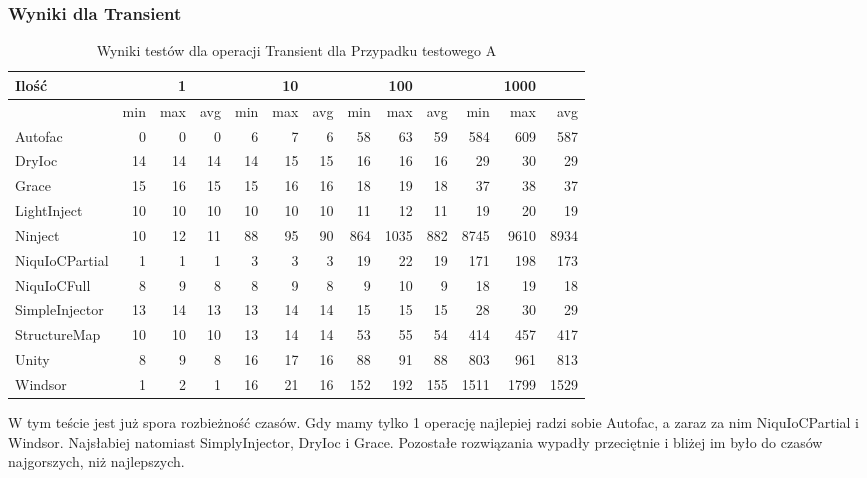 \documentclass[12pt]{article}
\begin{document}
\subsubsection{Wyniki dla Transient}
\begin{table}[H]
\captionsetup{belowskip=0pt,aboveskip=0pt}
\begin{center}
\begin{small}
	\begin{tabular}{ | l | r r r | r r r | r r r | r r r | }
    		\hline
Ilość & & 1 & & & 10 & & & 100 & & & 1000 & \\ \hline
 & min & max & avg & min & max & avg & min & max & avg & min & max & avg \\ \hline
Autofac & 0 & 0 & 0 & 6 & 7 & 6 & 58 & 63 & 59 & 584 & 609 & 587 \\ \hline
DryIoc & 14 & 14 & 14 & 14 & 15 & 15 & 16 & 16 & 16 & 29 & 30 & 29 \\ \hline
Grace & 15 & 16 & 15 & 15 & 16 & 16 & 18 & 19 & 18 & 37 & 38 & 37 \\ \hline
LightInject & 10 & 10 & 10 & 10 & 10 & 10 & 11 & 12 & 11 & 19 & 20 & 19 \\ \hline
Ninject & 10 & 12 & 11 & 88 & 95 & 90 & 864 & 1035 & 882 & 8745 & 9610 & 8934 \\ \hline
NiquIoCPartial & 1 & 1 & 1 & 3 & 3 & 3 & 19 & 22 & 19 & 171 & 198 & 173 \\ \hline
NiquIoCFull & 8 & 9 & 8 & 8 & 9 & 8 & 9 & 10 & 9 & 18 & 19 & 18 \\ \hline
SimpleInjector & 13 & 14 & 13 & 13 & 14 & 14 & 15 & 15 & 15 & 28 & 30 & 29 \\ \hline
StructureMap & 10 & 10 & 10 & 13 & 14 & 14 & 53 & 55 & 54 & 414 & 457 & 417 \\ \hline
Unity & 8 & 9 & 8 & 16 & 17 & 16 & 88 & 91 & 88 & 803 & 961 & 813 \\ \hline
Windsor & 1 & 2 & 1 & 16 & 21 & 16 & 152 & 192 & 155 & 1511 & 1799 & 1529 \\ \hline
  	\end{tabular}
\end{small}
\end{center}
\caption{Wyniki testów dla operacji Transient dla Przypadku testowego A}
\label{TestCaseA_Transient}
\end{table}
W tym teście jest już spora rozbieżność czasów. Gdy mamy tylko 1 operację najlepiej radzi sobie Autofac, a zaraz za nim NiquIoCPartial i Windsor. Najsłabiej natomiast SimplyInjector, DryIoc i Grace. Pozostałe rozwiązania wypadły przeciętnie i bliżej im było do czasów najgorszych, niż najlepszych.\\
\end{document}
